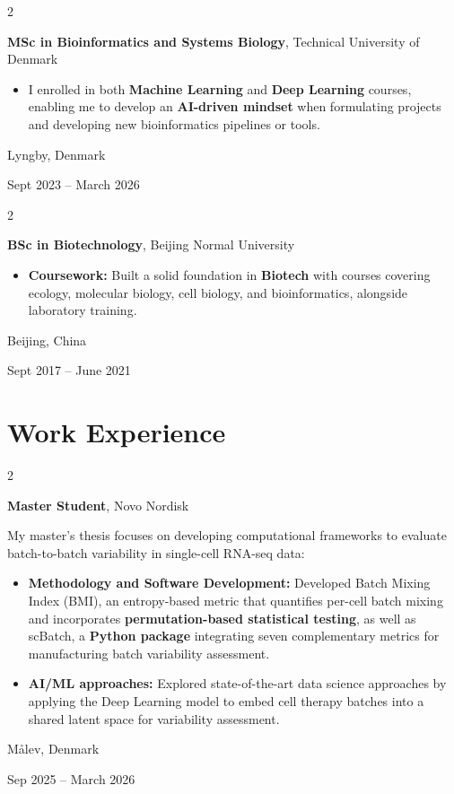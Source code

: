 \documentclass[10pt, letterpaper]{article}
\newenvironment{highlights}{
    \begin{itemize}[
        topsep=0.10 cm,
        parsep=0.10 cm,
        partopsep=0pt,
        itemsep=0pt,
        leftmargin=0.4 cm + 10pt
    ]
}{
    \end{itemize}
}
\newenvironment{twocolentry}[2][]{
    \onecolentry
    \def\secondColumn{#2}
    \setcolumnwidth{\fill, 4.5 cm}
    \begin{paracol}{2}
}{
    \switchcolumn \raggedleft \secondColumn
    \end{paracol}
    \endonecolentry
}
\begin{document}
        \begin{twocolentry}{
    Lyngby, Denmark

    Sept 2023 -- March 2026
}
    \textbf{MSc in Bioinformatics and Systems Biology}, Technical University of Denmark
    \begin{highlights}
        \item I enrolled in both \textbf{Machine Learning} and \textbf{Deep Learning} courses, enabling me to develop an \textbf{AI-driven mindset} when formulating projects and developing new bioinformatics pipelines or tools.
    \end{highlights}
\end{twocolentry}

        \vspace{0.3 cm}

\begin{twocolentry}{
    Beijing, China

    Sept 2017 -- June 2021
}
    \textbf{BSc in Biotechnology}, Beijing Normal University
    \begin{highlights}
        \item \textbf{Coursework:} Built a solid foundation in \textbf{Biotech} with courses covering ecology, molecular biology, cell biology, and bioinformatics, alongside laboratory training.
    \end{highlights}
\end{twocolentry}


    \section{Work Experience}

        \begin{twocolentry}{
    Målev, Denmark

    Sep 2025 -- March 2026
}
    \textbf{Master Student}, Novo Nordisk

    \vspace{0.1cm}

    My master's thesis focuses on developing computational frameworks to evaluate batch-to-batch variability in single-cell RNA-seq data:

    \begin{highlights}

        \item \textbf{Methodology and Software Development:} Developed Batch Mixing Index (BMI), an entropy-based metric that quantifies per-cell batch mixing and incorporates \textbf{permutation-based statistical testing}, as well as scBatch, a \textbf{Python package} integrating seven complementary metrics for manufacturing batch variability assessment.

        \vspace{0.1cm}

        \item \textbf{AI/ML approaches:} Explored state-of-the-art data science approaches by applying the Deep Learning model to embed cell therapy batches into a shared latent space for variability assessment.

    \end{highlights}
\end{twocolentry}
\end{document}
